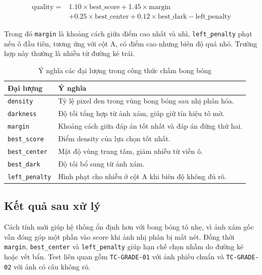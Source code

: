 \begin{equation}
\begin{aligned}
\mathrm{quality} ={}& 1.10 \times \mathrm{best\_score}
+ 1.45 \times \mathrm{margin} \\
&+ 0.25 \times \mathrm{best\_center}
+ 0.12 \times \mathrm{best\_dark}
- \mathrm{left\_penalty}
\end{aligned}
\end{equation}

Trong đó \texttt{margin} là khoảng cách giữa điểm cao nhất và nhì, \texttt{left\_penalty} phạt nếu ô đầu tiên, tương ứng với cột A, có điểm cao nhưng biên độ quá nhỏ. Trường hợp này thường là nhiễu từ đường kẻ trái.

\begin{longtable}{|L{3.4cm}|L{10.6cm}|}
\caption{Ý nghĩa các đại lượng trong công thức chấm bong bóng}
\label{tab:bubble-score-fields}\\
\hline
\textbf{Đại lượng} & \textbf{Ý nghĩa} \\
\hline
\texttt{density} & Tỷ lệ pixel đen trong vùng bong bóng sau nhị phân hóa. \\
\hline
\texttt{darkness} & Độ tối tổng hợp từ ảnh xám, giúp giữ tín hiệu tô mờ. \\
\hline
\texttt{margin} & Khoảng cách giữa đáp án tốt nhất và đáp án đứng thứ hai. \\
\hline
\texttt{best\_score} & Điểm density của lựa chọn tốt nhất. \\
\hline
\texttt{best\_center} & Mật độ vùng trung tâm, giảm nhiễu từ viền ô. \\
\hline
\texttt{best\_dark} & Độ tối bổ sung từ ảnh xám. \\
\hline
\texttt{left\_penalty} & Hình phạt cho nhiễu ở cột A khi biên độ không đủ rõ. \\
\hline
\end{longtable}

\subsection{Kết quả sau xử lý}

Cách tính mới giúp hệ thống ổn định hơn với bong bóng tô nhẹ, vì ảnh xám gốc vẫn đóng góp một phần vào score khi ảnh nhị phân bị mất nét. Đồng thời \texttt{margin}, \texttt{best\_center} và \texttt{left\_penalty} giúp hạn chế chọn nhầm do đường kẻ hoặc vết bẩn. Test liên quan gồm \texttt{TC-GRADE-01} với ảnh phiếu chuẩn và \texttt{TC-GRADE-02} với ảnh có câu không rõ.

